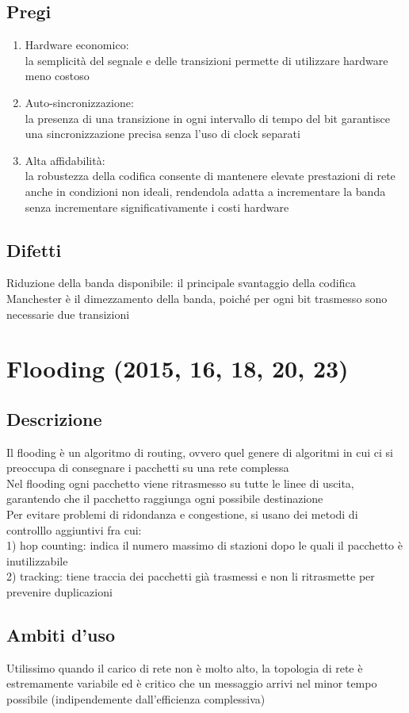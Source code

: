\documentclass[10pt,oneside,a4paper]{article}
\begin{document}
\subsection{Pregi}
\begin{enumerate}
\item Hardware economico:\\
la semplicità del segnale e delle transizioni permette di utilizzare hardware meno costoso
\item Auto-sincronizzazione:\\
la presenza di una transizione in ogni intervallo di tempo del bit garantisce una sincronizzazione precisa senza l'uso di clock separati
\item Alta affidabilità:\\
la robustezza della codifica consente di mantenere elevate prestazioni di rete anche in condizioni non ideali, rendendola adatta a incrementare la banda senza incrementare significativamente i costi hardware
\end{enumerate}
\subsection{Difetti}
Riduzione della banda disponibile: il principale svantaggio della codifica Manchester è il dimezzamento della banda, poiché per ogni bit trasmesso sono necessarie due transizioni
\section{Flooding (2015, 16, 18, 20, 23)}
\subsection{Descrizione}
Il flooding è un algoritmo di routing, ovvero quel genere di algoritmi in cui ci si preoccupa di consegnare i pacchetti su una rete complessa\\
Nel flooding ogni pacchetto viene ritrasmesso su tutte le linee di uscita, garantendo che il pacchetto raggiunga ogni possibile destinazione\\
Per evitare problemi di ridondanza e congestione, si usano dei metodi di controlllo aggiuntivi fra cui:\\
1) hop counting: indica il numero massimo di stazioni dopo le quali il pacchetto è inutilizzabile\\
2) tracking: tiene traccia dei pacchetti già trasmessi e non li ritrasmette per prevenire duplicazioni
\subsection{Ambiti d'uso}
Utilissimo quando il carico di rete non è molto alto, la topologia di rete è estremamente variabile ed è critico che un messaggio arrivi nel minor tempo possibile (indipendemente dall'efficienza complessiva)
\end{document}
